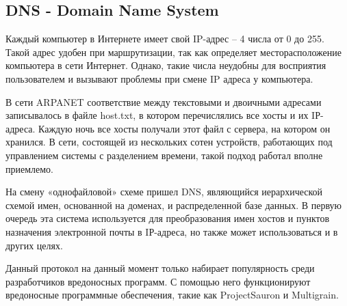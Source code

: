 \subsection{DNS - Domain Name System}

Каждый компьютер в Интернете имеет свой IP-адрес – 4 числа от 0 до 255. Такой адрес удобен при маршрутизации, так как определяет месторасположение компьютера в сети Интернет. Однако, такие числа неудобны для восприятия пользователем и вызывают проблемы при смене IP адреса у компьютера.

В сети ARPANET соответствие между текстовыми и двоичными адресами записывалось в файле host.txt, в котором перечислялись все хосты и их IР-адреса. Каждую ночь все хосты получали этот файл с сервера, на котором он хранился. В сети, состоящей из нескольких сотен устройств, работающих под управлением системы с разделением времени, такой подход работал вполне приемлемо. 

На смену «однофайловой» схеме пришел DNS, являющийся иерархической схемой имен, основанной на доменах, и распределенной базе данных. В первую очередь эта система используется для преобразования имен хостов и пунктов назначения электронной почты в IР-адреса, но также может использоваться и в других целях.

Данный протокол на данный момент только набирает популярность среди разработчиков вредоносных программ. С помощью него функционируют вредоносные программные обеспечения, такие как ProjectSauron и Multigrain. 